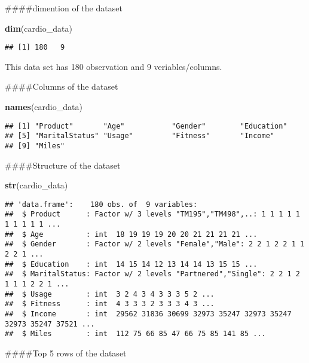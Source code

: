 \documentclass[
]{article}
\newenvironment{Shaded}{\begin{snugshade}}{\end{snugshade}}
\newcommand{\KeywordTok}[1]{\textcolor[rgb]{0.13,0.29,0.53}{\textbf{#1}}}
\newcommand{\NormalTok}[1]{#1}
\begin{document}
\#\#\#\#dimention of the dataset

\begin{Shaded}
\begin{Highlighting}[]
\KeywordTok{dim}\NormalTok{(cardio_data)}
\end{Highlighting}
\end{Shaded}

\begin{verbatim}
## [1] 180   9
\end{verbatim}

This data set has 180 observation and 9 veriables/columns.

\#\#\#\#Columns of the dataset

\begin{Shaded}
\begin{Highlighting}[]
\KeywordTok{names}\NormalTok{(cardio_data)}
\end{Highlighting}
\end{Shaded}

\begin{verbatim}
## [1] "Product"       "Age"           "Gender"        "Education"    
## [5] "MaritalStatus" "Usage"         "Fitness"       "Income"       
## [9] "Miles"
\end{verbatim}

\#\#\#\#Structure of the dataset

\begin{Shaded}
\begin{Highlighting}[]
\KeywordTok{str}\NormalTok{(cardio_data)}
\end{Highlighting}
\end{Shaded}

\begin{verbatim}
## 'data.frame':    180 obs. of  9 variables:
##  $ Product      : Factor w/ 3 levels "TM195","TM498",..: 1 1 1 1 1 1 1 1 1 1 ...
##  $ Age          : int  18 19 19 19 20 20 21 21 21 21 ...
##  $ Gender       : Factor w/ 2 levels "Female","Male": 2 2 1 2 2 1 1 2 2 1 ...
##  $ Education    : int  14 15 14 12 13 14 14 13 15 15 ...
##  $ MaritalStatus: Factor w/ 2 levels "Partnered","Single": 2 2 1 2 1 1 1 2 2 1 ...
##  $ Usage        : int  3 2 4 3 4 3 3 3 5 2 ...
##  $ Fitness      : int  4 3 3 3 2 3 3 3 4 3 ...
##  $ Income       : int  29562 31836 30699 32973 35247 32973 35247 32973 35247 37521 ...
##  $ Miles        : int  112 75 66 85 47 66 75 85 141 85 ...
\end{verbatim}

\#\#\#\#Top 5 rows of the dataset
\end{document}
